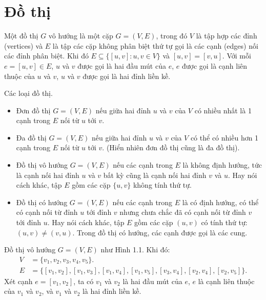 \documentclass[12pt,oneside,a4paper]{bookAnh1}
\theoremstyle{plain}
\theoremstyle{nonumberplain}
\numberwithin{equation}{chapter}
\begin{document}
{ \section{Đồ thị}
\begin{definition}
Một đồ thị $G$ vô hướng là một cặp $G = (V, E)$, trong đó $V$ là tập hợp các đỉnh (vertices) và $E$ là tập các cặp không phân biệt thứ tự gọi là các cạnh (edges) nối các đỉnh phân biệt. Khi đó $E \subseteq \{[u, v] : u, v \in V\}$ và $[u, v] = [v, u]$. Với mỗi $e = [u, v] \in E$, $u$ và $v$ được gọi là hai đầu mút của $e$, $e$ được gọi là cạnh liên thuộc của $u$ và $v$, $u$ và $v$ được gọi là hai đỉnh liền kề.  
\end{definition}
\begin{definition}
Các loại đồ thị.
\begin{itemize}
    \item Đơn đồ thị $G = (V, E)$ nếu giữa hai đỉnh $u$ và $v$ của $V$ có nhiều nhất là 1 cạnh trong $E$ nối từ $u$ tới $v$.
    \item Đa đồ thị $G = (V, E)$ nếu giữa hai đỉnh $u$ và $v$ của $V$ có thể có nhiều hơn 1 cạnh trong $E$ nối từ $u$ tới $v$. (Hiển nhiên đơn đồ thị cũng là đa đồ thị).
    \item Đồ thị vô hướng $G = (V, E)$ nếu các cạnh trong $E$ là không định hướng, tức là cạnh nối hai đỉnh $u$ và $v$ bất kỳ cũng là cạnh nối hai đỉnh $v$ và $u$. Hay nói cách khác, tập $E$ gồm các cặp $\{u, v\}$ không tính thứ tự.
    \item Đồ thị có hướng $G = (V, E)$ nếu các cạnh trong $E$ là có định hướng, có thể có cạnh nối từ đỉnh $u$ tới đỉnh $v$ nhưng chưa chắc đã có cạnh nối từ đỉnh $v$ tới đỉnh $u$. Hay nói cách khác, tập $E$ gồm các cặp $(u, v)$ có tính thứ tự: $(u, v) \neq (v, u)$. Trong đồ thị có hướng, các cạnh được gọi là các cung.
\end{itemize}  
\end{definition}
\begin{example}
Đồ thị vô hướng $G = (V, E)$ như Hình 1.1. Khi đó:
\begin{align*}
    V &= \{v_1, v_2, v_3, v_4, v_5\}. \\
    E &= \{[v_1, v_2], [v_1, v_3], [v_1, v_4], [v_1, v_5], [v_3, v_4], [v_2, v_4], [v_2, v_5]\}.
\end{align*}
Xét cạnh $e = [v_1, v_2]$, ta có $v_1$ và $v_2$ là hai đầu mút của $e$, $e$ là cạnh liên thuộc của $v_1$ và $v_2$, và $v_1$ và $v_2$ là hai đỉnh liền kề.   
\end{example}
\begin{figure}[hpt!]
	\centering
\end{figure}}
\end{document}
